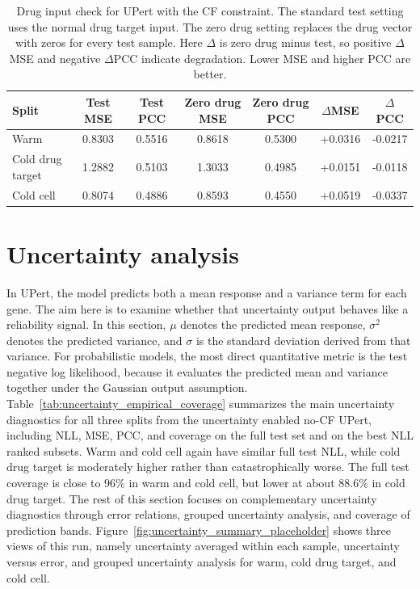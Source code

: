 \begin{table}[htbp]
\centering
\caption[CF Drug Input Check]{Drug input check for UPert with the CF constraint. The standard test setting uses the normal drug target input. The zero drug setting replaces the drug vector with zeros for every test sample. Here $\Delta$ is zero drug minus test, so positive $\Delta$MSE and negative $\Delta$PCC indicate degradation. Lower MSE and higher PCC are better.}
\label{tab:drug_zero_sanity_cf}
\begin{tabular}{lcccccc}
\hline
Split & Test MSE & Test PCC & Zero drug MSE & Zero drug PCC & $\Delta$MSE & $\Delta$PCC \\
\hline
Warm & 0.8303 & 0.5516 & 0.8618 & 0.5300 & +0.0316 & -0.0217 \\
Cold drug target & 1.2882 & 0.5103 & 1.3033 & 0.4985 & +0.0151 & -0.0118 \\
Cold cell & 0.8074 & 0.4886 & 0.8593 & 0.4550 & +0.0519 & -0.0337 \\
\hline
\end{tabular}
\end{table}

\section{Uncertainty analysis}
In UPert, the model predicts both a mean response and a variance term for each gene. The aim here is to examine whether that uncertainty output behaves like a reliability signal. In this section, $\mu$ denotes the predicted mean response, $\sigma^{2}$ denotes the predicted variance, and $\sigma$ is the standard deviation derived from that variance. For probabilistic models, the most direct quantitative metric is the test negative log likelihood, because it evaluates the predicted mean and variance together under the Gaussian output assumption. Table~\ref{tab:uncertainty_empirical_coverage} summarizes the main uncertainty diagnostics for all three splits from the uncertainty enabled no-CF UPert, including NLL, MSE, PCC, and coverage on the full test set and on the best NLL ranked subsets. Warm and cold cell again have similar full test NLL, while cold drug target is moderately higher rather than catastrophically worse. The full test coverage is close to 96\% in warm and cold cell, but lower at about 88.6\% in cold drug target. The rest of this section focuses on complementary uncertainty diagnostics through error relations, grouped uncertainty analysis, and coverage of prediction bands. Figure~\ref{fig:uncertainty_summary_placeholder} shows three views of this run, namely uncertainty averaged within each sample, uncertainty versus error, and grouped uncertainty analysis for warm, cold drug target, and cold cell.

